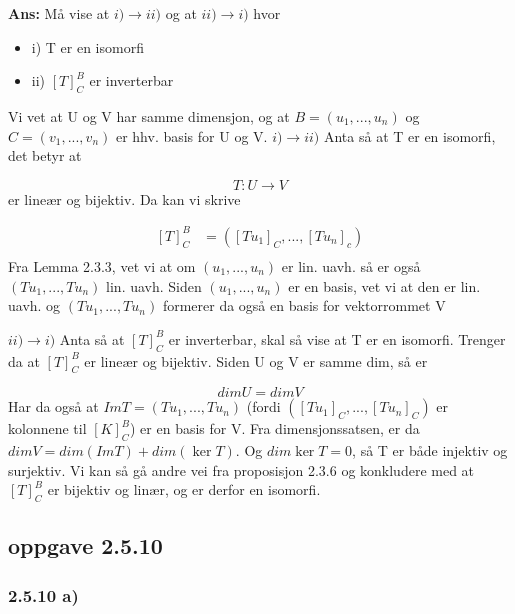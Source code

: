 \documentclass[11pt]{article}
\newenvironment{solbox}
  {\begin{mdframed}[linewidth=1pt,linecolor=black,roundcorner=5pt]
   \noindent\textbf{Ans: }\enspace}
  {\end{mdframed}}
\begin{document}
\begin{solbox}
  Må vise at $ i) \rightarrow ii) $ og at $ ii) \rightarrow i) $  hvor
  \begin{itemize}
    \item i) T er en isomorfi
    \item ii) $ \left[ T \right] _C^B $ er inverterbar 
  \end{itemize} 

  Vi vet at U og V har samme dimensjon, og at $ B = \left( u_1, ..., u_n \right)  $ og $ C = \left( v_1, ..., v_n \right)  $ er hhv. basis for U og V. $ i) \rightarrow  ii)$  Anta så at T er en isomorfi, det betyr at 

  \[
      T:U \rightarrow V
  \]
  er lineær og bijektiv. Da kan vi skrive 
  

  \begin{align*}
    \left[ T \right] _C^B &= \left( \left[ Tu_1 \right] _C, ..., \left[ Tu_n \right] _c \right) \\
  \end{align*}
  Fra Lemma 2.3.3, vet vi at om $ \left( u_1, ..., u_n \right)  $ er lin. uavh. så er også $ \left( Tu_1, ..., Tu_n \right)  $ lin. uavh. Siden $ \left( u_1, ..., u_n \right)  $ er en basis, vet vi at den er lin. uavh. og $ \left( Tu_1, ..., Tu_n \right) $ formerer da også en basis for vektorrommet V


  $ ii) \rightarrow i) $ Anta så at $ \left[ T \right] _C^B $ er inverterbar, skal så vise at T er en isomorfi. Trenger da at $ \left[ T \right] _C^B $ er lineær og bijektiv. Siden U og V er samme dim,  så er 
  
  \[
      dimU = dimV
  \]
  Har da også at $ ImT = \left( Tu_1, ..., Tu_n \right) $ (fordi $ \left( \left[ Tu_1 \right] _C, ..., \left[ Tu_n \right] _C \right)  $ er kolonnene til $ \left[ K \right] _C^B $)   er en basis for V. Fra dimensjonssatsen, er da $ dimV = dim(ImT) + dim(\ker T) $. Og $ dim \ker T = 0 $, så T er både injektiv og surjektiv. Vi kan så gå andre vei fra proposisjon 2.3.6 og konkludere med at $ \left[ T \right] _C^B $ er bijektiv og linær, og er derfor en isomorfi. 

\end{solbox}

\subsection{oppgave 2.5.10}


\subsubsection{2.5.10 a)}
\end{document}
